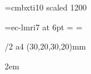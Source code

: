 

\let\LMTone\relax %


%
\def\tensingle{\baselineskip 11.50pt}
\def\tenonehalf{\baselineskip 17.32pt}
\def\tendouble{\baselineskip 23.14pt}

\def\twelvesingle{\baselineskip 13.84pt}
\def\twelveonehalf{\baselineskip 20.84pt}
\def\twelvedouble{\baselineskip 27.72pt}

\font\twelvebfit=cmbxti10 scaled 1200
\let\bfit=\twelvebfit

\font\sixit=ec-lmri7 at 6pt
\scriptfont\itfam=\eightit
\scriptscriptfont\itfam=\sixit


\def\Orange{\setcmykcolor{0 0.5 1 0}}
\def\Blue{\setcmykcolor{1 .43 0 0}}
\def\liBlue{\setcmykcolor{.2 .08 0 0}}
\def\liGrey{\setcmykcolor{0 0 0 0.13}}
\let\nBlue=\Blue 

\def\blackwhite{\let\Blue=\Grey \let\nBlue=\Black \let\Red=\Grey \let\liBlue=\liGrey}
\let\trysavetoner=\relax

\def\savetoner{\def\trysavetoner{%
  \ifx\drafttext\empty
     \message{WARNING: final (not \string\draft) version,
              \noexpand\savetoner ignored}
  \else
     \let\liBlue=\White
     \let\liGrey=\White %
  \fi 
}}

\hyperlinks{\Black}{\Black}
\def\tocborder{1 .8 0} 
\let\pgborder\tocborder
\let\citeborder\tocborder
\let\refborder\tocborder
\let\urlborder\tocborder

\ifx\localcolor\undefined  \let\locc=\relax \else \let\locc=\localcolor \fi



\margins/2 a4 (30,20,30,20)mm %

\emergencystretch 2em %
\hfuzz 0.3pt    
\vfuzz \hfuzz   

